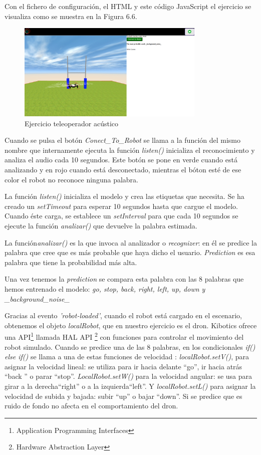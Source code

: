 Con el fichero de configuración, el HTML y este código JavaScript el ejercicio se visualiza como se muestra en la Figura 6.6.

\begin{figure}[H]
    \centering
    \includegraphics[width=0.8\textwidth, height=0.4\textwidth]{chapters/images/audio.png}
    \caption{Ejercicio teleoperador acústico}
    \label{fig:my_label}
\end{figure}

Cuando se pulsa el botón \textit{Conect\_To\_Robot} se llama a la función del mismo nombre que internamente ejecuta  la función \textit{listen()}  inicializa el reconocimiento y analiza el audio cada 10 segundos.
Este botón se pone en verde cuando está analizando y en rojo cuando está desconectado, mientras el bóton esté de ese color el robot no reconoce ninguna palabra.

La función \textit{listen()} inicializa el modelo y crea las etiquetas que necesita. Se ha creado un \textit{setTimeout} para esperar 10 segundos hasta que cargue el modelo. Cuando éste carga, se establece un \textit{setInterval} para que cada 10 segundos se ejecute la función \textit{analizar()} que devuelve la palabra estimada.

La función\textit{analizar()} es la que invoca al analizador o \textit{recognizer}: en él se predice la palabra que cree que es más probable que haya dicho el usuario.  \textit{Prediction} es esa palabra que tiene  la probabilidad más alta.

Una vez tenemos la \textit{prediction} se compara esta palabra con las 8 palabras que hemos entrenado el modelo: \textit{go, stop, back, right, left, up, down y \_background\_noise\_}

Gracias al evento \textit{'robot-loaded'}, cuando el robot está cargado en el escenario, obtenemos el objeto \textit{localRobot}, que en nuestro ejercicio es el dron. Kibotics ofrece una API\footnote{Application Programming Interfaces} llamada HAL API \footnote{Hardware Abstraction Layer} con funciones para controlar el movimiento del robot simulado. Cuando se predice una de las 8 palabras, en los condicionales \textit{if(){} else if() {}} se llama a una de estas funciones de velocidad : \textit{localRobot.setV()}, para asignar la velocidad lineal: se utiliza para ir hacia delante ``go'', ir hacia atrás ``back '' o parar ``stop''.  \textit{LocalRobot.setW()} para la velocidad angular: se usa para girar a la derecha``right'' o a la izquierda``left''. Y \textit{localRobot.setL()} para asignar la velocidad de subida y bajada: subir ``up'' o bajar ``down''. Si se predice que es ruido de fondo no afecta en el comportamiento del dron.


